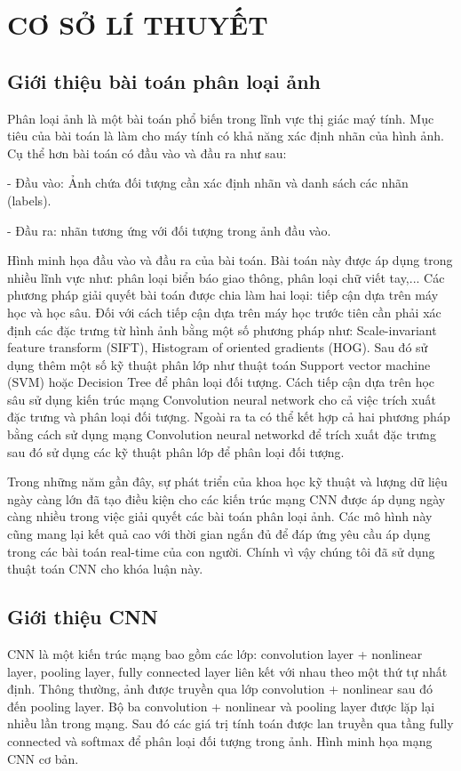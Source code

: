 
\chapter{CƠ SỞ LÍ THUYẾT}

\section{Giới thiệu bài toán phân loại ảnh}
Phân loại ảnh là một bài toán phổ biến trong lĩnh vực thị giác maý tính. Mục tiêu của bài toán là làm cho máy tính có khả năng xác định nhãn của hình ảnh. Cụ thể hơn bài toán có đầu vào và đầu ra như sau:

- Đầu vào: Ảnh chứa đối tượng cần xác định nhãn và danh sách các nhãn (labels).

- Đầu ra: nhãn tương ứng với đối tượng trong ảnh đầu vào.

Hình minh họa đầu vào và đầu ra của bài toán. Bài toán này được áp dụng trong nhiều lĩnh vực như: phân loại biển báo giao thông, phân loại chữ viết tay,... Các phương pháp giải quyết bài toán được chia làm hai loại: tiếp cận dựa trên máy học và học sâu. Đối với cách tiếp cận dựa trên máy học trước tiên cần phải xác định các đặc trưng từ hình ảnh bằng một số phương pháp như: Scale-invariant feature transform (SIFT), Histogram of oriented gradients (HOG). Sau đó sử dụng thêm một số kỹ thuật phân lớp như thuật toán Support vector machine (SVM) hoặc Decision Tree để phân loại đối tượng. Cách tiếp cận dựa trên học sâu sử dụng kiến trúc mạng Convolution neural network cho cả việc trích xuất đặc trưng và phân loại đối tượng. Ngoài ra ta có thể kết hợp cả hai phương pháp bằng cách sử dụng mạng Convolution neural networkd để trích xuất đặc trưng sau đó sử dụng các kỹ thuật phân lớp để phân loại đối tượng. 

Trong những năm gần đây, sự phát triển của khoa học kỹ thuật và lượng dữ liệu ngày càng lớn đã tạo điều kiện cho các kiến trúc mạng CNN được áp dụng ngày càng nhiều trong việc giải quyết các bài toán phân loại ảnh. Các mô hình này cũng mang lại kết quả cao với thời gian ngắn đủ để đáp ứng yêu cầu áp dụng trong các bài toán real-time của con người. Chính vì vậy chúng tôi đã sử dụng thuật toán CNN cho khóa luận này.

\section{Giới thiệu CNN}
CNN là một kiến trúc mạng bao gồm các lớp: convolution layer + nonlinear layer, pooling layer, fully connected layer liên kết với nhau theo một thứ tự nhất định. Thông thường, ảnh được truyền qua lớp convolution + nonlinear sau đó đến pooling layer. Bộ ba convolution + nonlinear và pooling layer được lặp lại nhiều lần trong mạng. Sau đó các giá trị tính toán được lan truyền qua tầng fully connected và softmax để phân loại đối tượng trong ảnh. Hình minh họa mạng CNN cơ bản.


